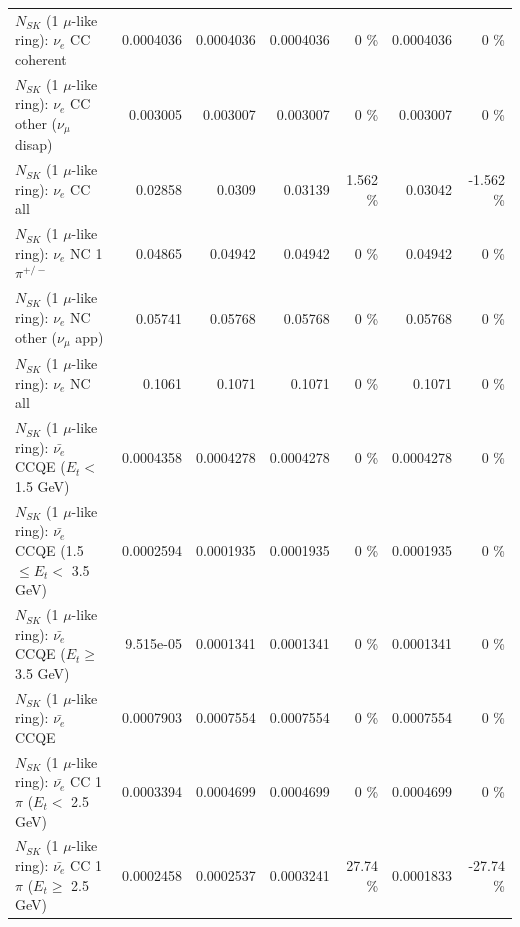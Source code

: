 \begin{table}
\begin{tabular}{| l | r | r | r  r | r  r |}
                               $N_{SK}$ (1 $\mu$-like ring): $\nu_e$ CC coherent &       0.0004036 &       0.0004036 &       0.0004036 &        0 \%  &       0.0004036 &        0 \%  \\ 
                $N_{SK}$ (1 $\mu$-like ring): $\nu_e$ CC other ($\nu_\mu$ disap) &        0.003005 &        0.003007 &        0.003007 &        0 \%  &        0.003007 &        0 \%  \\ 
                                  $N_{SK}$ (1 $\mu$-like ring): $\nu_{e}$ CC all &         0.02858 &          0.0309 &         0.03139 &    1.562 \%  &         0.03042 &   -1.562 \%  \\ 
\hline
                           $N_{SK}$ (1 $\mu$-like ring): $\nu_e$ NC 1$\pi^{+/-}$ &         0.04865 &         0.04942 &         0.04942 &        0 \%  &         0.04942 &        0 \%  \\ 
                  $N_{SK}$ (1 $\mu$-like ring): $\nu_e$ NC other ($\nu_\mu$ app) &         0.05741 &         0.05768 &         0.05768 &        0 \%  &         0.05768 &        0 \%  \\ 
                                  $N_{SK}$ (1 $\mu$-like ring): $\nu_{e}$ NC all &          0.1061 &          0.1071 &          0.1071 &        0 \%  &          0.1071 &        0 \%  \\ 
\hline
\hline
\hline
            $N_{SK}$ (1 $\mu$-like ring): $\bar{\nu_e}$ CCQE ($E_{t} <$ 1.5 GeV) &       0.0004358 &       0.0004278 &       0.0004278 &        0 \%  &       0.0004278 &        0 \%  \\ 
   $N_{SK}$ (1 $\mu$-like ring): $\bar{\nu_e}$ CCQE (1.5 $\leq E_{t} <$ 3.5 GeV) &       0.0002594 &       0.0001935 &       0.0001935 &        0 \%  &       0.0001935 &        0 \%  \\ 
         $N_{SK}$ (1 $\mu$-like ring): $\bar{\nu_e}$ CCQE ($E_{t} \geq$ 3.5 GeV) &       9.515e-05 &       0.0001341 &       0.0001341 &        0 \%  &       0.0001341 &        0 \%  \\ 
\hline
                                $N_{SK}$ (1 $\mu$-like ring): $\bar{\nu_e}$ CCQE &       0.0007903 &       0.0007554 &       0.0007554 &        0 \%  &       0.0007554 &        0 \%  \\ 
\hline
       $N_{SK}$ (1 $\mu$-like ring): $\bar{\nu_e}$ CC 1$\pi$ ($E_{t} <$ 2.5 GeV) &       0.0003394 &       0.0004699 &       0.0004699 &        0 \%  &       0.0004699 &        0 \%  \\ 
    $N_{SK}$ (1 $\mu$-like ring): $\bar{\nu_e}$ CC 1$\pi$ ($E_{t} \geq$ 2.5 GeV) &       0.0002458 &       0.0002537 &       0.0003241 &    27.74 \%  &       0.0001833 &   -27.74 \%  \\ 

\end{tabular}
\end{table}
